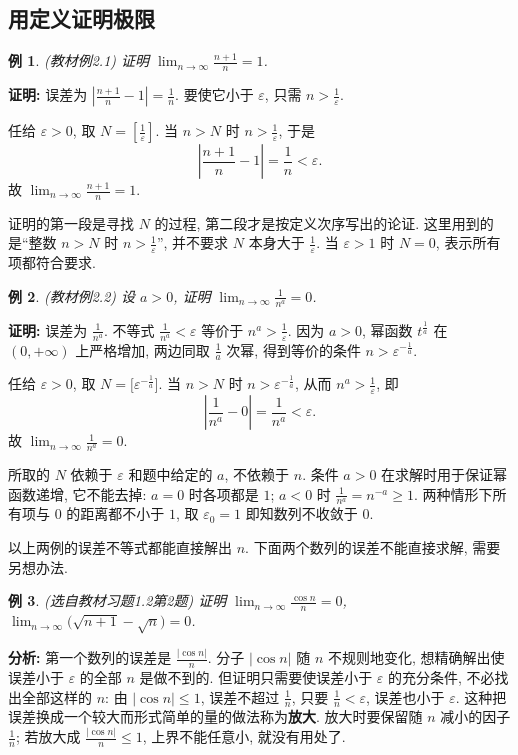 \documentclass[UTF8,openany]{ctexbook}
\theoremstyle{chinesetextbook}
\newtheorem{example}{例}[section]
\newenvironment{cnproof}{\par\indent\textbf{证明:} \ignorespaces}{\par}
\begin{document}
\subsection{用定义证明极限}
\begin{example}
\textnormal{(教材例2.1)} 证明 $\displaystyle\lim_{n\to\infty}\frac{n+1}n=1$.
\end{example}
\begin{cnproof}
误差为 $\displaystyle\left|\frac{n+1}n-1\right|=\frac1n$. 要使它小于 $\varepsilon$, 只需 $\displaystyle n>\frac1\varepsilon$.

任给 $\varepsilon>0$, 取 $\displaystyle N=\left[\frac1\varepsilon\right]$. 当 $n>N$ 时 $\displaystyle n>\frac1\varepsilon$, 于是
\[
\left|\frac{n+1}n-1\right|=\frac1n<\varepsilon.
\]
故 $\displaystyle\lim_{n\to\infty}\frac{n+1}n=1$.
\end{cnproof}
证明的第一段是寻找 $N$ 的过程, 第二段才是按定义次序写出的论证. 这里用到的是“整数 $n>N$ 时 $\displaystyle n>\frac1\varepsilon$”, 并不要求 $N$ 本身大于 $\displaystyle\frac1\varepsilon$. 当 $\varepsilon>1$ 时 $N=0$, 表示所有项都符合要求.
\begin{example}
\textnormal{(教材例2.2)} 设 $a>0$, 证明 $\displaystyle\lim_{n\to\infty}\frac1{n^a}=0$.
\end{example}
\begin{cnproof}
误差为 $\displaystyle\frac1{n^a}$. 不等式 $\displaystyle\frac1{n^a}<\varepsilon$ 等价于 $\displaystyle n^a>\frac1\varepsilon$. 因为 $a>0$, 幂函数 $t^{\frac1a}$ 在 $(0,+\infty)$ 上严格增加, 两边同取 $\displaystyle\frac1a$ 次幂, 得到等价的条件 $n>\varepsilon^{-\frac1a}$.

任给 $\varepsilon>0$, 取 $N=\bigl[\varepsilon^{-\frac1a}\bigr]$. 当 $n>N$ 时 $n>\varepsilon^{-\frac1a}$, 从而 $\displaystyle n^a>\frac1\varepsilon$, 即
\[
\left|\frac1{n^a}-0\right|=\frac1{n^a}<\varepsilon.
\]
故 $\displaystyle\lim_{n\to\infty}\frac1{n^a}=0$.
\end{cnproof}
所取的 $N$ 依赖于 $\varepsilon$ 和题中给定的 $a$, 不依赖于 $n$. 条件 $a>0$ 在求解时用于保证幂函数递增, 它不能去掉: $a=0$ 时各项都是 $1$; $a<0$ 时 $\displaystyle\frac1{n^a}=n^{-a}\ge1$. 两种情形下所有项与 $0$ 的距离都不小于 $1$, 取 $\varepsilon_0=1$ 即知数列不收敛于 $0$.

以上两例的误差不等式都能直接解出 $n$. 下面两个数列的误差不能直接求解, 需要另想办法.
\begin{example}
\textnormal{(选自教材习题1.2第2题)} 证明 $\displaystyle\lim_{n\to\infty}\frac{\cos n}n=0$, $\displaystyle\lim_{n\to\infty}\bigl(\sqrt{n+1}-\sqrt n\bigr)=0$.
\end{example}
\par\indent\textbf{分析:} 第一个数列的误差是 $\displaystyle\frac{|\cos n|}n$. 分子 $|\cos n|$ 随 $n$ 不规则地变化, 想精确解出使误差小于 $\varepsilon$ 的全部 $n$ 是做不到的. 但证明只需要使误差小于 $\varepsilon$ 的充分条件, 不必找出全部这样的 $n$: 由 $|\cos n|\le1$, 误差不超过 $\displaystyle\frac1n$, 只要 $\displaystyle\frac1n<\varepsilon$, 误差也小于 $\varepsilon$. 这种把误差换成一个较大而形式简单的量的做法称为\textbf{放大}. 放大时要保留随 $n$ 减小的因子 $\displaystyle\frac1n$; 若放大成 $\displaystyle\frac{|\cos n|}n\le1$, 上界不能任意小, 就没有用处了.
\end{document}
